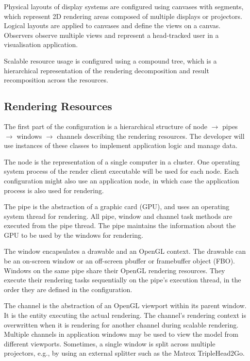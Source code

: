 Physical layouts of display systems are configured using canvases with
segments, which represent 2D rendering areas composed of multiple displays or
projectors. Logical layouts are applied to canvases and define the views on a
canvas. Observers observe multiple views and represent a head-tracked user in a
visualisation application.

Scalable resource usage is configured using a compound tree, which is a
hierarchical representation of the rendering decomposition and result
recomposition across the resources.

\subsection{Rendering Resources}

The first part of the configuration is a hierarchical structure of node
$\rightarrow$ pipes $\rightarrow$ win\-dows $\rightarrow$ channels describing
the rendering resources. The developer will use instances of these classes to
implement application logic and manage data.

The \textsf{node} is the representation of a single computer in a cluster. One operating
system process of the render client executable will be used for each node. Each
configuration might also use an application node, in which case the application
process is also used for rendering.

The \textsf{pipe} is the abstraction of a graphic card (GPU), and uses an
operating system thread for rendering. All pipe, window and channel task methods
are executed from the pipe thread. The pipe maintains the information about the
GPU to be used by the windows for rendering.

The \textsf{window} encapsulates a drawable and an OpenGL context. The drawable
can be an on-screen window or an off-screen pbuffer or framebuffer object
(FBO). Windows on the same pipe share their OpenGL rendering resources. They
execute their rendering tasks sequentially on the pipe's execution thread, in
the order they are defined in the configuration.

The \textsf{channel} is the abstraction of an OpenGL viewport within its parent
window. It is the entity executing the actual rendering. The channel's
rendering context is overwritten when it is rendering for another channel
during scalable rendering. Multiple channels in application windows may be used
to view the model from different viewports. Sometimes, a single window is split
across multiple projectors, e.g., by using an external splitter such as the
Matrox TripleHead2Go.


